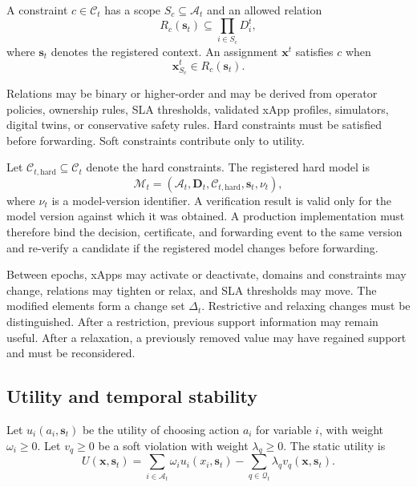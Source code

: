 \documentclass[pdflatex,sn-mathphys-num,iicol,oneside]{sn-jnl}
\begin{document}
A constraint $c\in\mathcal{C}_t$ has a scope
$S_c\subseteq\mathcal{A}_t$ and an allowed relation
\begin{equation}
R_c(\bm{s}_t)
\subseteq
\prod_{i\in S_c}D_i^t,
\label{eq:relation}
\end{equation}
where $\bm{s}_t$ denotes the registered context. An assignment
$\bm{x}^t$ satisfies $c$ when
\begin{equation}
\bm{x}_{S_c}^t\in R_c(\bm{s}_t).
\end{equation}

Relations may be binary or higher-order and may be derived from
operator policies, ownership rules, SLA thresholds, validated xApp
profiles, simulators, digital twins, or conservative safety rules.
Hard constraints must be satisfied before forwarding. Soft
constraints contribute only to utility.

Let
$\mathcal{C}_{t,\mathrm{hard}}\subseteq\mathcal{C}_t$
denote the hard constraints. The registered hard model is
\begin{equation}
\mathcal{M}_t=
\left(
\mathcal{A}_t,
\bm{D}_t,
\mathcal{C}_{t,\mathrm{hard}},
\bm{s}_t,
\nu_t
\right),
\label{eq:model}
\end{equation}
where $\nu_t$ is a model-version identifier. A verification result is
valid only for the model version against which it was obtained. A
production implementation must therefore bind the decision,
certificate, and forwarding event to the same version and re-verify a
candidate if the registered model changes before forwarding.

Between epochs, xApps may activate or deactivate, domains and
constraints may change, relations may tighten or relax, and SLA
thresholds may move. The modified elements form a change set
$\Delta_t$. Restrictive and relaxing changes must be distinguished.
After a restriction, previous support information may remain useful.
After a relaxation, a previously removed value may have regained
support and must be reconsidered.

\subsection{Utility and temporal stability}

Let $u_i(a_i,\bm{s}_t)$ be the utility of choosing action $a_i$ for
variable $i$, with weight $\omega_i\geq 0$. Let $v_q\geq 0$ be a soft
violation with weight $\lambda_q\geq 0$. The static utility is
\begin{equation}
U(\bm{x},\bm{s}_t)
=
\sum_{i\in\mathcal{A}_t}
\omega_i u_i(x_i,\bm{s}_t)
-
\sum_{q\in\mathcal{Q}_t}
\lambda_q v_q(\bm{x},\bm{s}_t).
\label{eq:static-utility}
\end{equation}
\end{document}
